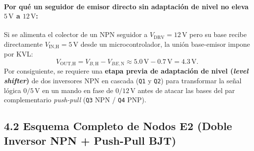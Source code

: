 \documentclass[10pt, a4paper, landscape]{article}
\begin{document}
\paragraph{Por qué un seguidor de emisor directo sin adaptación de nivel no eleva $5\,\text{V}$ a $12\,\text{V}$:}
Si se alimenta el colector de un NPN seguidor a $V_{\text{DRV}} = 12\,\text{V}$ pero su base recibe directamente $V_{\text{IN,H}} = 5\,\text{V}$ desde un microcontrolador, la unión base-emisor impone por KVL:
\begin{equation}
    V_{\text{OUT,H}} = V_{B,\text{H}} - V_{BE,\text{N}} \approx 5.0\,\text{V} - 0.7\,\text{V} = 4.3\,\text{V}.
\end{equation}
Por consiguiente, se requiere una \textbf{etapa previa de adaptación de nivel (\textit{level shifter})} de dos inversores NPN en cascada (\texttt{Q1} y \texttt{Q2}) para transformar la señal lógica $0/5\,\text{V}$ en un mando en fase de $0/12\,\text{V}$ antes de atacar las bases del par complementario \textit{push-pull} (\texttt{Q3} NPN / \texttt{Q4} PNP).

\subsection*{4.2 Esquema Completo de Nodos E2 (Doble Inversor NPN + Push-Pull BJT)}
\end{document}
